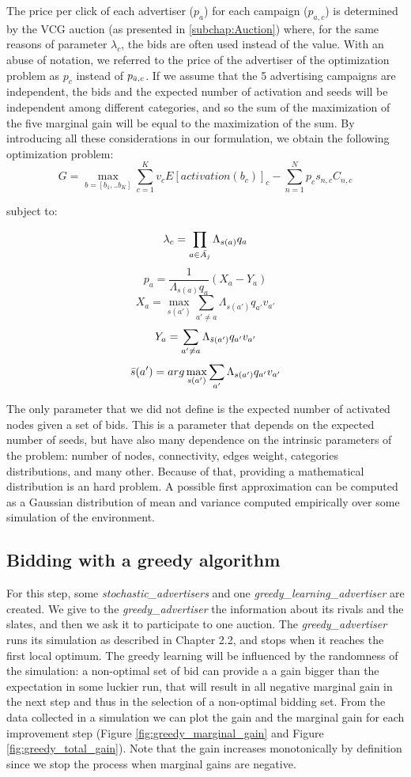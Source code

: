 \documentclass{article}
\begin{document}
The price per click of each advertiser ($p_a$) for each campaign ($p_{a,c}$) is determined by the VCG auction (as presented in \autoref{subchap:Auction}) where, for the same reasons of parameter $\lambda_c$, the bids are often used instead of the value. 
With an abuse of notation, we referred to the price of the advertiser of the optimization problem as $p_c$ instead of $p_{\Bar{a},c}$.
\newline
If we assume that the 5 advertising campaigns are independent, the bids and the expected number of activation and seeds will be independent among different categories, and so the sum of the maximization of the five marginal gain will be equal to the maximization of the sum.
\newline
By introducing all these considerations in our formulation, we obtain the following optimization problem:
\[
G = \max_{b=[b_1,..b_K]} \sum_{c=1}^{K} v_cE[activation(b_c)]_c - \sum_{n=1}^{N}p_c s_{n,c} C_{n,c}
\]
\centerline{subject to:}
\[
\lambda_c = \prod_{a \in \Bar{A_j}}\Lambda_{s(a)}q_a
\]
\[ p_a = \frac{1}{\Lambda_{s(a)}q_a}(X_a - Y_a) \]
\[ X_a = \max_{s(a')} \sum_{a'\neq a} \Lambda_{s(a')}q_{a'}v_{a'} \]
\[ Y_a = \sum_{a' \neq a} \Lambda_{\Bar{s}(a')}q_{a'}v_{a'} \]
\[ \Bar{s}(a') = arg\max_{s(a')} \sum_{a'} \Lambda_{s(a')}q_{a'}v_{a'} \]

The only parameter that we did not define is the expected number of activated nodes given a set of bids. This is a parameter that depends on the expected number of seeds, but have also many dependence on the intrinsic parameters of the problem: number of nodes, connectivity, edges weight, categories distributions, and many other. 
Because of that, providing a mathematical distribution is an hard problem. A possible first approximation can be computed as a Gaussian distribution of mean and variance computed empirically over some simulation of the environment.


\subsection{Bidding with a greedy algorithm}
For this step, some \emph{stochastic\_advertisers} and one \emph{greedy\_learning\_advertiser} are created.
We give to the \emph{greedy\_advertiser} the information about its rivals and the slates, and then we ask it to participate to one auction.
The \emph{greedy\_advertiser} runs its simulation as described in Chapter 2.2, and stops when it reaches the first local optimum. 
The greedy learning will be influenced by the randomness of the simulation: a non-optimal set of bid can provide a a gain bigger than the expectation in some luckier run, that will result in all negative marginal gain in the next step and thus in the selection of a non-optimal bidding set.
From the data collected in a simulation we can plot the gain and the marginal gain for each improvement step (Figure \ref{fig:greedy_marginal_gain} and Figure \ref{fig:greedy_total_gain}). Note that the gain increases monotonically by definition since we stop the process when marginal gains are negative.
\end{document}
